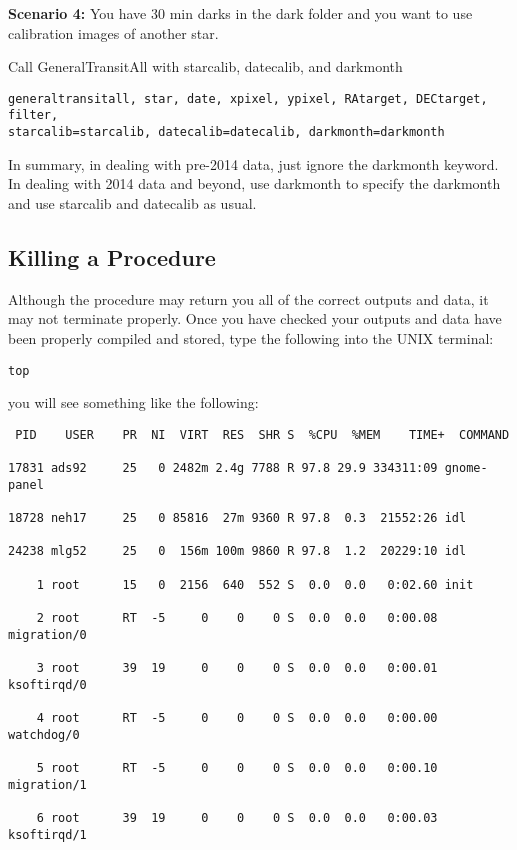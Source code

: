 \documentclass[10pt,preprint]{aastex}
\begin{document}
\textbf{Scenario 4:} You have 30 min darks in the dark folder and you want to use calibration images of another star.

Call GeneralTransitAll with starcalib, datecalib, and darkmonth
\begin{verbatim}
generaltransitall, star, date, xpixel, ypixel, RAtarget, DECtarget, filter,
starcalib=starcalib, datecalib=datecalib, darkmonth=darkmonth
\end{verbatim}

In summary, in dealing with pre-2014 data, just ignore the darkmonth keyword. In dealing with 2014 data and beyond, use darkmonth to specify the darkmonth and use starcalib and datecalib as usual.

\subsection{Killing a Procedure}

Although the procedure may return you all of the correct outputs and data, it may not terminate properly. Once you have checked your 
outputs and data have been properly compiled and stored, type the following into the UNIX terminal:
\begin{verbatim}top
\end{verbatim}

you will see something like the following:

\begin{verbatim}
 PID    USER    PR  NI  VIRT  RES  SHR S  %CPU  %MEM    TIME+  COMMAND 
                                                       
17831 ads92     25   0 2482m 2.4g 7788 R 97.8 29.9 334311:09 gnome-panel    
                                                
18728 neh17     25   0 85816  27m 9360 R 97.8  0.3  21552:26 idl                                                            

24238 mlg52     25   0  156m 100m 9860 R 97.8  1.2  20229:10 idl                                                            

    1 root      15   0  2156  640  552 S  0.0  0.0   0:02.60 init                                                           

    2 root      RT  -5     0    0    0 S  0.0  0.0   0:00.08 migration/0                                                    

    3 root      39  19     0    0    0 S  0.0  0.0   0:00.01 ksoftirqd/0                                                    

    4 root      RT  -5     0    0    0 S  0.0  0.0   0:00.00 watchdog/0                                                     

    5 root      RT  -5     0    0    0 S  0.0  0.0   0:00.10 migration/1                                                    

    6 root      39  19     0    0    0 S  0.0  0.0   0:00.03 ksoftirqd/1   

\end{verbatim}        
\end{document}
